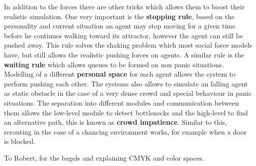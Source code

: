 \documentclass[sigconf]{acmart}
\begin{document}
In addition to the forces there are other tricks which allows them to boost their realistic simulation. 
One very important is the \textbf{stopping rule}, based on the personality and current situation an agent may stop moving for a given time before he continues walking toward its attractor, however the agent can still be pushed away. This rule solves the shaking problem which most social force models have, but still allows the realistic pushing forces on agents. 
A similar rule is the \textbf{waiting rule} which allows queues to be formed on non panic situations. Modelling of a different \textbf{personal space} for each agent allows the system to perform pushing each other. 
The systems also allows to simulate an falling agent as static obstacle in the case of a very dense crowd and special behaviour in panic situations. 
The separation into different modules and communication between them allows the low-level module to detect bottlenecks and the high-level to find an alternative path, this is known as \textbf{crowd impatience}. Similar to this, rerouting in the case of a chancing environment works, for example when a door is blocked.

\begin{acks}
To Robert, for the bagels and explaining CMYK and color spaces.
\end{acks}




\appendix
\end{document}
